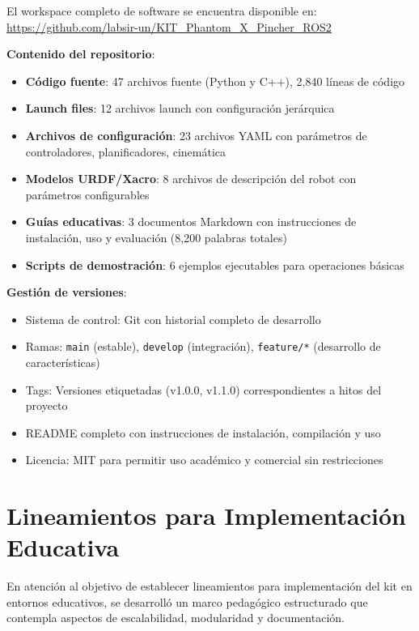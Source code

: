 El workspace completo de software se encuentra disponible en: \url{https://github.com/labsir-un/KIT_Phantom_X_Pincher_ROS2}

\textbf{Contenido del repositorio}:
\begin{itemize}
    \item \textbf{Código fuente}: 47 archivos fuente (Python y C++), 2,840 líneas de código
    \item \textbf{Launch files}: 12 archivos launch con configuración jerárquica
    \item \textbf{Archivos de configuración}: 23 archivos YAML con parámetros de controladores, planificadores, cinemática
    \item \textbf{Modelos URDF/Xacro}: 8 archivos de descripción del robot con parámetros configurables
    \item \textbf{Guías educativas}: 3 documentos Markdown con instrucciones de instalación, uso y evaluación (8,200 palabras totales)
    \item \textbf{Scripts de demostración}: 6 ejemplos ejecutables para operaciones básicas
\end{itemize}

\textbf{Gestión de versiones}:
\begin{itemize}
    \item Sistema de control: Git con historial completo de desarrollo
    \item Ramas: \texttt{main} (estable), \texttt{develop} (integración), \texttt{feature/*} (desarrollo de características)
    \item Tags: Versiones etiquetadas (v1.0.0, v1.1.0) correspondientes a hitos del proyecto
    \item README completo con instrucciones de instalación, compilación y uso
    \item Licencia: MIT para permitir uso académico y comercial sin restricciones
\end{itemize}

\section{Lineamientos para Implementación Educativa}

En atención al objetivo de establecer lineamientos para implementación del kit en entornos educativos, se desarrolló un marco pedagógico estructurado que contempla aspectos de escalabilidad, modularidad y documentación.

